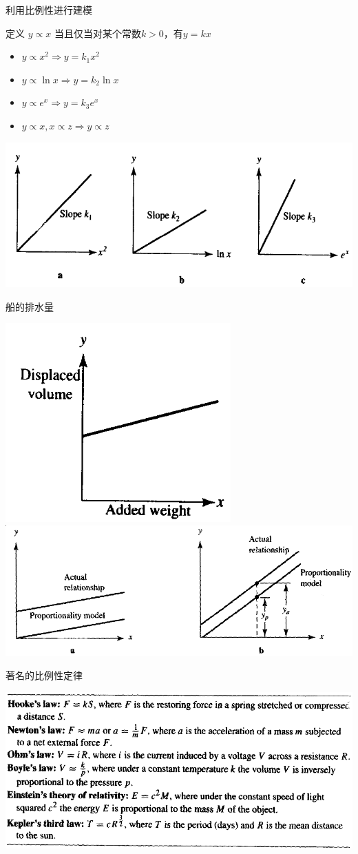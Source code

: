 \documentclass[mathserif]{beamer}
\begin{document}
\begin{frame}{利用比例性进行建模}
  \begin{block}{定义}
    $y \propto x$ 当且仅当对某个常数$k>0$，有$y=kx$
  \end{block}

  \begin{itemize}
  \item $y \propto x^2 \Rightarrow y=k_1x^2$
  \item $y \propto \ln x \Rightarrow y=k_2\ln x$
  \item $y \propto e^x \Rightarrow y=k_3 e^x$
  \item $y \propto x, x \propto z \Rightarrow y \propto z$
  \end{itemize}

  \begin{center}
    \includegraphics[width=.6\textwidth{}]{proptofig.png}
  \end{center}
\end{frame}

\begin{frame}{船的排水量}
  \begin{center}
    \includegraphics[width=.3\textwidth{}]{boatwater.png}
    \includegraphics[width=.6\textwidth{}]{propapprox.png}
  \end{center}
\end{frame}

\begin{frame}{著名的比例性定律}
  \begin{center}
    \includegraphics[width=.8\textwidth{}]{proptheory.png}
  \end{center}
\end{frame}
\end{document}
